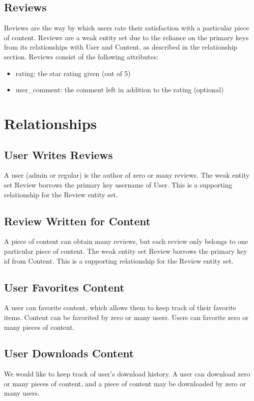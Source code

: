 \documentclass[letter, 12pt, titlepage]{article}
\begin{document}
			\subsection{Reviews}
			Reviews are the way by which users rate their satisfaction with a particular piece of content. Reviews are a weak entity set due to the reliance on the primary keys from its relationships with User and Content, as described in the relationship section. Reviews consist of the following attributes:
			\begin{itemize}
				\item rating: the star rating given (out of 5)
				\item user\_comment: the comment left in addition to the rating (optional)
			\end{itemize}

	\section{Relationships}
		\subsection{User Writes Reviews}
			A user (admin or regular) is the author of zero or many reviews. The weak entity set Review borrows the primary key username of User. This is a supporting relationship for the Review entity set.
		\subsection{Review Written for Content}
			A piece of content can obtain many reviews, but each review only belongs to one particular piece of content. The weak entity set Review borrows the primary key id from Content. This is a supporting relationship for the Review entity set.
		\subsection{User Favorites Content}
			A user can favorite content, which allows them to keep track of their favorite items. Content can be favorited by zero or many users. Users can favorite zero or many pieces of content.	
		\subsection{User Downloads Content}
			We would like to keep track of user's download history. A user can download zero or many pieces of content, and a piece of content may be downloaded by zero or many users.
\end{document}
